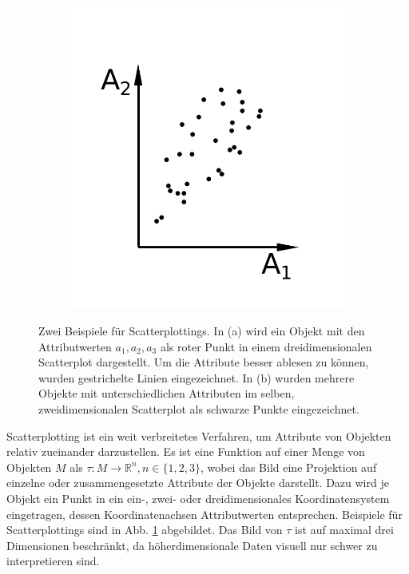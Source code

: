 \documentclass[a4paper,fontsize=12pt,toc=bib,halfparskip]{scrartcl}
\begin{document}
\begin{figure}
\begin{subfigure}{0.30\textwidth}
		\includegraphics[width=\textwidth]{pictures/Scatterplot2D}
		\caption{}
	\end{subfigure}
	\hspace{2cm}
	\caption{Zwei Beispiele f\"ur Scatterplottings. In (a) wird ein Objekt mit den Attributwerten $a_1, a_2, a_3$ als roter Punkt in einem dreidimensionalen Scatterplot dargestellt. Um die Attribute besser ablesen zu k\"onnen, wurden gestrichelte Linien eingezeichnet. In (b) wurden mehrere Objekte mit unterschiedlichen Attributen im selben, zweidimensionalen Scatterplot als schwarze Punkte eingezeichnet.}
	\label{Scatterplots}
\end{figure}

Scatterplotting ist ein weit verbreitetes Verfahren, um Attribute von Objekten relativ zueinander darzustellen. Es ist eine Funktion auf einer Menge von Objekten $M$ als $\tau: M \rightarrow \mathbb{R}^n,n\in\{1,2,3\}$, wobei das Bild eine Projektion auf einzelne oder zusammengesetzte Attribute der Objekte darstellt.  Dazu wird je Objekt ein Punkt in ein ein-, zwei- oder dreidimensionales Koordinatensystem eingetragen, dessen Koordinatenachsen Attributwerten entsprechen. Beispiele f\"ur Scatterplottings sind in Abb. \ref{Scatterplots} abgebildet. Das Bild von $\tau$ ist auf maximal drei Dimensionen beschr\"ankt, da h\"oherdimensionale Daten visuell nur schwer zu interpretieren sind.
\end{document}
